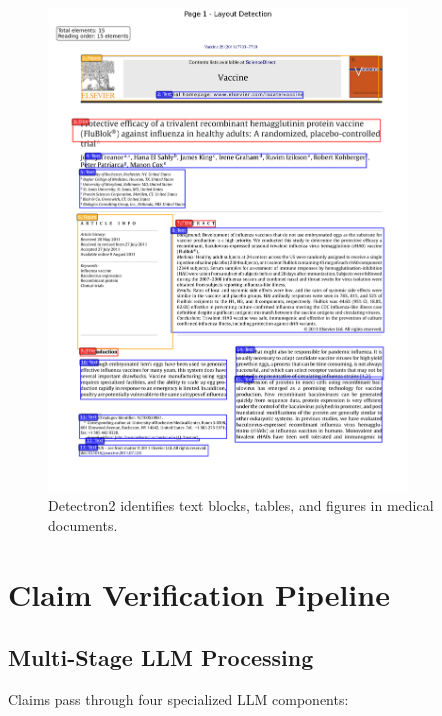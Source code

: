 \documentclass[11pt]{article}
\begin{document}
\begin{figure}[htbp]
\centering
\includegraphics[width=0.85\textwidth]{scientific_layout_example.png}
\caption{Detectron2 identifies text blocks, tables, and figures in medical documents.}
\end{figure}

\section{Claim Verification Pipeline}

\subsection{Multi-Stage LLM Processing}

Claims pass through four specialized LLM components:
\end{document}
